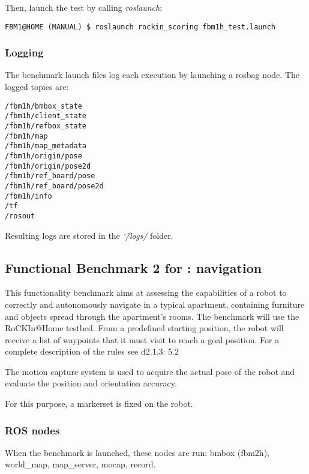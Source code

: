 \documentclass[a4paper]{article}
\newcommand{\logdir}{\char`\~/logs/}
\begin{document}
Then, launch the test by calling \emph{roslaunch}:
\begin{verbatim}
FBM1@HOME (MANUAL) $ roslaunch rockin_scoring fbm1h_test.launch
\end{verbatim}

\clearpage

\subsubsection{Logging}

The benchmark launch files log each execution by launching a rosbag node.
The logged topics are:

\begin{verbatim}
/fbm1h/bmbox_state
/fbm1h/client_state
/fbm1h/refbox_state
/fbm1h/map
/fbm1h/map_metadata
/fbm1h/origin/pose
/fbm1h/origin/pose2d
/fbm1h/ref_board/pose
/fbm1h/ref_board/pose2d
/fbm1h/info
/tf
/rosout
\end{verbatim}

Resulting logs are stored in the \emph{\logdir} folder.

\clearpage


\subsection{Functional Benchmark 2 for \ro@Home: navigation}
\label{sec:fbm2h}
This functionality benchmark aims at assessing the capabilities of a robot to correctly and autonomously navigate in a typical apartment, containing furniture and objects spread through the apartment’s rooms. The benchmark will use the RoCKIn@Home testbed. From a predefined starting position, the robot will receive a list of waypoints that it must visit to reach a goal position.
For a complete description of the rules see d2.1.3: 5.2

The motion capture system is used to acquire the actual pose of the robot and evaluate the position and orientation accuracy.

For this purpose, a markerset is fixed on the robot.

\subsubsection{ROS nodes}

When the benchmark is launched, these nodes are run: bmbox (fbm2h), world_map, map_server, mocap, record.
\end{document}
